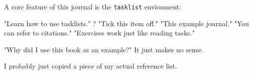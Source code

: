 \documentclass[%
	raggedright, %
]{journal}
\begin{document}
\logday[1]
A core feature of this journal is the {\tt tasklist} envionment:
%
%
%
%
%
%
%
%
\begin{tasklist}
	\todo* "Learn how to use tasklists."
	\todo? "Tick this item off."
	\read "This example journal."
	 "You can refer to citations."
	 "Exercises work just like reading tasks."

	 "Why did I use this book as an example?" \label{qstn:why}
		It just makes no sense.

	 I probably just copied a piece of my actual reference list.
\end{tasklist}
\end{document}
